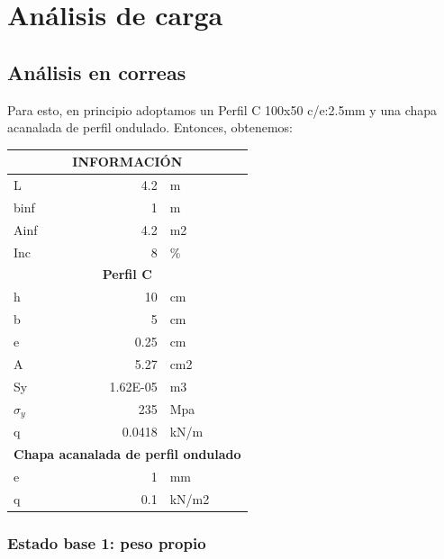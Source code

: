 \documentclass[../main.tex]{subfiles}
\begin{document}
\section{Análisis de carga}

\subsection{Análisis en correas}


Para esto, en principio adoptamos un Perfil C 100x50 c/e:2.5mm y una chapa
acanalada de perfil ondulado. Entonces, obtenemos:

\begin{table}[htbp]
  \centering
    \begin{tabular}{|l|r|l|}
    \hline
    \multicolumn{3}{|c|}{\textbf{INFORMACIÓN}} \bigstrut\\
    \hline
    L     & 4.2   & m \bigstrut\\
    \hline
    binf  & 1     & m \bigstrut\\
    \hline
    Ainf  & 4.2   & m2 \bigstrut\\
    \hline
    Inc   & 8     & \% \bigstrut\\
    \hline
    \multicolumn{3}{|c|}{\textbf{Perfil C}} \bigstrut\\
    \hline
    h     & 10    & cm \bigstrut\\
    \hline
    b     & 5     & cm \bigstrut\\
    \hline
    e     & 0.25  & cm \bigstrut\\
    \hline
    A     & 5.27  & cm2 \bigstrut\\
    \hline
    Sy    & 1.62E-05 & m3 \bigstrut\\
    \hline
    $\sigma_y$    & 235   & Mpa \bigstrut\\
    \hline
    q     & 0.0418 & kN/m \bigstrut\\
    \hline
    \multicolumn{3}{|c|}{\multirow{2}[2]{*}{\textbf{Chapa acanalada de perfil ondulado}}} \bigstrut[t]\\
    \multicolumn{3}{|c|}{} \bigstrut[b]\\
    \hline
    e     & 1     & mm \bigstrut\\
    \hline
    q     & 0.1   & kN/m2 \bigstrut\\
    \hline
    \end{tabular}%
\end{table}%


\subsubsection{Estado base 1: peso propio}
\end{document}
